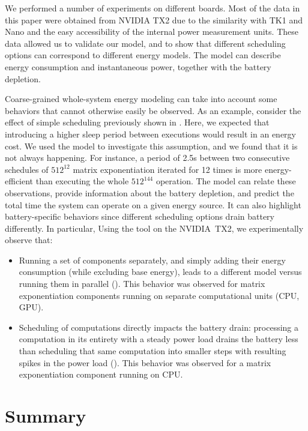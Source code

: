 We performed a number of experiments on different boards. Most of the data in this paper were obtained from NVIDIA TX2 due to the similarity with TK1 and Nano and the easy accessibility of the internal power measurement units. These data allowed us to validate our model, and to show that different scheduling options can correspond to different energy models. The model can describe energy consumption and instantaneous power, together with the battery depletion.

Coarse-grained whole-system energy modeling can take into account some behaviors that cannot otherwise easily be observed. %
As an example, consider the effect of simple scheduling previously shown in . Here, we expected that introducing a higher sleep period between executions would result in an energy cost. We used the model to investigate this assumption, and we found that it is not always happening. For instance, a period of 2.5s between two consecutive schedules of $512^{12}$ matrix exponentiation iterated for 12 times is more energy-efficient than executing the whole $512^{144}$ operation. The model can relate these observations, provide information about the battery depletion, and predict the total time the system can operate on a given energy source. It can also highlight battery-specific behaviors since different scheduling options drain battery differently. In particular, Using the \powprof{} tool on the NVIDIA~TX2, we experimentally observe that:
\begin{itemize}
  \item Running a set of components separately, and simply adding their energy consumption (while excluding base energy), leads to a different model versus running them in parallel (). This behavior was observed for matrix exponentiation components running on separate computational units (CPU, GPU).
  \item Scheduling of computations directly impacts the battery drain: processing a computation in its entirety with a steady power load drains the battery less than scheduling that same computation into smaller steps with resulting spikes in the power load (). This behavior was observed for a matrix exponentiation component running on CPU.
\end{itemize}


\section{\color{red}Summary}

